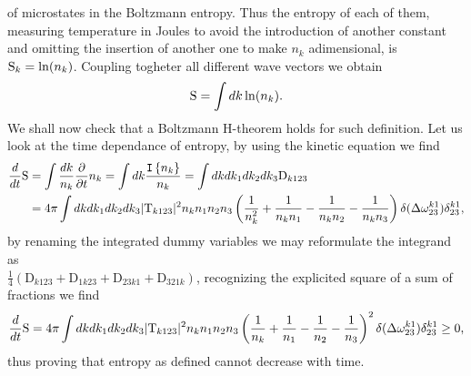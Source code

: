 of microstates in the Boltzmann entropy. Thus the entropy of each of them, measuring temperature in Joules to avoid the introduction of another constant
and omitting the insertion of another one to make $n_k$ adimensional, is $\mathrm{S}_k = \ln(n_k)$. Coupling togheter all different wave vectors we obtain 
\begin{equation}
    \mathrm{S} = \int dk \ln(n_k).
\end{equation}
We shall now check that a Boltzmann H-theorem holds for such definition. Let us look at the time dependance of entropy, by using the kinetic equation we find
\begin{align}
    \frac{d}{dt} \mathrm{S} &= \int \frac{dk}{n_k} \frac{\partial}{\partial t} n_k = \int dk \frac{\mathtt{I}\left\{n_k\right\}}{n_k} = \int dk dk_1 dk_2 dk_3 \mathrm{D}_{k123}\\
    &= 4\pi \int dk dk_1 dk_2 dk_3 |\mathrm{T}_{k123}|^2 n_k n_1 n_2 n_3 \left(\frac{1}{n_k^2} + \frac{1}{n_k n_1}-\frac{1}{n_k n_2}-\frac{1}{n_k n_3}\right)
    \delta(\Delta{\omega}^{k1}_{23})\delta^{k1}_{23},
\end{align}
by renaming the integrated dummy variables we may reformulate the integrand as \\ 
$\frac{1}{4} \left(\mathrm{D}_{k123}+\mathrm{D}_{1k23}+\mathrm{D}_{23k1}+
\mathrm{D}_{321k} \right)$, recognizing the explicited square of a sum of fractions we find
\begin{equation}
    \frac{d}{dt} \mathrm{S} = 4\pi \int dk dk_1 dk_2 dk_3 |\mathrm{T}_{k123}|^2 n_k n_1 n_2 n_3 \left( \frac{1}{n_k} + \frac{1}{n_1}-\frac{1}{n_2}-\frac{1}{n_3}\right)^2 
    \delta(\Delta{\omega}^{k1}_{23})\delta^{k1}_{23}\ge 0,
\end{equation}
thus proving that entropy as defined cannot decrease with time. \\

